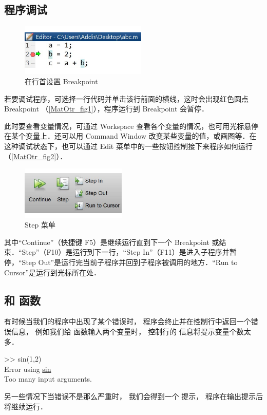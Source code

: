 

\subsection{程序调试}
\begin{figure}[ht]
\centering
\includegraphics[width= 6cm]{./figures/MatOtr1.pdf}
\caption{在行首设置 Breakpoint}\label{MatOtr_fig1}
\end{figure}

若要调试程序，可选择一行代码并单击该行前面的横线，这时会出现红色圆点 Breakpoint （\autoref{MatOtr_fig1}），程序运行到 Breakpoint 会暂停．

此时要查看变量情况，可通过 Workspace 查看各个变量的情况，也可用光标悬停在某个变量上．还可以用 Command Window 改变某些变量的值，或画图等．在这种调试状态下，也可以通过 Edit 菜单中的一些按钮控制接下来程序如何运行（\autoref{MatOtr_fig2}）．
\begin{figure}[ht]
\centering
\includegraphics[width= 5cm]{./figures/MatOtr2.pdf}
\caption{Step 菜单}\label{MatOtr_fig2}
\end{figure}
其中“Continue”（快捷键 F5）是继续运行直到下一个 Breakpoint 或结束．“Step”（F10）是运行到下一行，“Step In”（F11）是进入子程序并暂停，“Step Out”是运行完当前子程序并回到子程序被调用的地方．“Run to Cursor”是运行到光标所在处．

\subsection{ 和  函数}
有时候当我们的程序中出现了某个错误时， 程序会终止并在控制行中返回一个错误信息， 例如我们给  函数输入两个变量时， 控制行的  信息将提示变量个数太多．
\begin{Command}
>> sin(1,2)\\
{\color{error}Error using \underline{sin}\\
Too many input arguments.}
\end{Command}
另一些情况下当错误不是那么严重时， 我们会得到一个  提示， 程序在输出提示后将继续运行．

